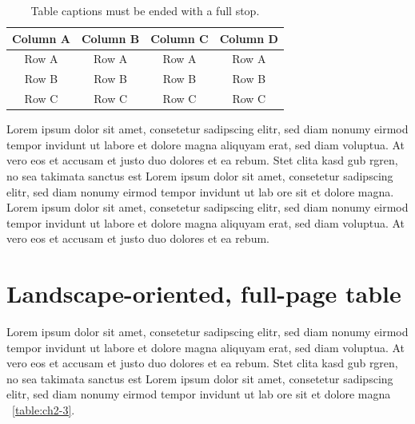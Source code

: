 \vspace{6pt} %
\begin{table}[!ht]
\centering
\setlength{\tabcolsep}{14pt}
\caption{Table captions must be ended with a full stop.}
\begin{tabular}{cccc}
\toprule\midrule
Column A & Column B & Column C & Column D \\
\midrule
Row A & Row A & Row A & Row A \\
Row B & Row B & Row B & Row B \\
Row C & Row C & Row C & Row C \\
\bottomrule
\end{tabular}
\label{table:ch2-2}
\end{table}
\vspace{-9pt} %

Lorem ipsum dolor sit amet, consetetur sadipscing elitr, sed diam nonumy eirmod tempor invidunt ut labore et dolore magna aliquyam erat, sed diam voluptua. At vero eos et accusam et justo duo dolores et ea rebum. Stet clita kasd gub rgren, no sea takimata sanctus est Lorem ipsum dolor sit amet, consetetur sadipscing elitr, sed diam nonumy eirmod tempor invidunt ut lab ore sit et dolore magna. Lorem ipsum dolor sit amet, consetetur sadipscing elitr, sed diam nonumy eirmod tempor invidunt ut labore et dolore magna aliquyam erat, sed diam voluptua. At vero eos et accusam et justo duo dolores et ea rebum. 

\section{Landscape-oriented, full-page table}

Lorem ipsum dolor sit amet, consetetur sadipscing elitr, sed diam nonumy eirmod tempor invidunt ut labore et dolore magna aliquyam erat, sed diam voluptua. At vero eos et accusam et justo duo dolores et ea rebum. Stet clita kasd gub rgren, no sea takimata sanctus est Lorem ipsum dolor sit amet, consetetur sadipscing elitr, sed diam nonumy eirmod tempor invidunt ut lab ore sit et dolore magna \tablename\ \ref{table:ch2-3}.

